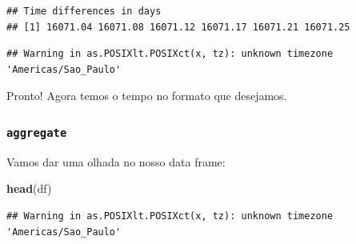 \documentclass[]{book}
\newenvironment{Shaded}{\begin{snugshade}}{\end{snugshade}}
\newcommand{\KeywordTok}[1]{\textcolor[rgb]{0.13,0.29,0.53}{\textbf{#1}}}
\newcommand{\StringTok}[1]{\textcolor[rgb]{0.31,0.60,0.02}{#1}}
\newcommand{\OperatorTok}[1]{\textcolor[rgb]{0.81,0.36,0.00}{\textbf{#1}}}
\newcommand{\NormalTok}[1]{#1}
\theoremstyle{definition}
\theoremstyle{definition}
\theoremstyle{definition}
\theoremstyle{remark}
\begin{document}
\begin{verbatim}
## Time differences in days
## [1] 16071.04 16071.08 16071.12 16071.17 16071.21 16071.25
\end{verbatim}

\begin{Shaded}
\end{Shaded}

\begin{verbatim}
## Warning in as.POSIXlt.POSIXct(x, tz): unknown timezone 'Americas/Sao_Paulo'
\end{verbatim}

Pronto! Agora temos o tempo no formato que desejamos.

\subsubsection{\texorpdfstring{\texttt{aggregate}}{aggregate}}\label{aggregate}

Vamos dar uma olhada no nosso data frame:

\begin{Shaded}
\begin{Highlighting}[]
\KeywordTok{head}\NormalTok{(df)}
\end{Highlighting}
\end{Shaded}

\begin{verbatim}
## Warning in as.POSIXlt.POSIXct(x, tz): unknown timezone 'Americas/Sao_Paulo'
\end{verbatim}
\end{document}
